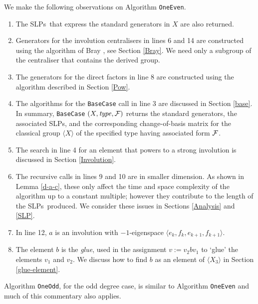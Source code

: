 \documentclass[12pt]{article}
\def\F{{\cal F}}
\def\SLPs{{\rm SLPs}}
\begin{document}
We make the following observations on Algorithm {\tt OneEven}. 
\begin{enumerate}
\item 
The \SLPs\ that express the standard generators 
in $X$ are also returned.

\item 
Generators for the involution centralisers in lines 
6 and 14 are constructed using the algorithm of Bray \cite{Bray},
see Section \ref{Bray}. 
We need only a subgroup of the centraliser that 
contains the derived group. 

\item 
The generators for the direct factors in line 8
are constructed using the algorithm described in Section \ref{Pow}.

\item 
The algorithms for the {\tt BaseCase} call in line 3 are 
discussed in Section \ref{base}.
In summary, {\tt BaseCase} $(X, {\it type}, \F)$ returns
the standard generators, the associated \SLPs, 
and the corresponding change-of-basis matrix
for the classical group $\langle X \rangle$ of the specified type
having associated form $\F$. 

\item 
The search in line 4 for an element that powers to a strong
involution is discussed in Section \ref{Involution}.

\item 
The recursive calls in lines 9 and 10 are
in smaller dimension. 
As shown in Lemma \ref{d-a-c}, these only affect 
the time and space complexity of the
algorithm up to a constant multiple; however they contribute 
to the length of the \SLPs\ produced. 
We consider these issues in 
Sections \ref{Analysis} and \ref{SLP}.  

\item 
In line 12, $a$ is an involution  with $-1$-eigenspace
$\langle e_k,f_k,e_{k+1},f_{k+1}\rangle$. 

\item 
The element $b$ is the {\it glue},
used in the assignment $v := v_2bv_1$ to `glue' the elements 
$v_1$ and $v_2$. 
We discuss how to find $b$ as an element of 
$\langle X_3\rangle$ in Section \ref{glue-element}.
\end{enumerate}

Algorithm {\tt OneOdd}, for the odd degree case, 
is similar to Algorithm {\tt OneEven} and 
much of this commentary also applies. 
\end{document}
